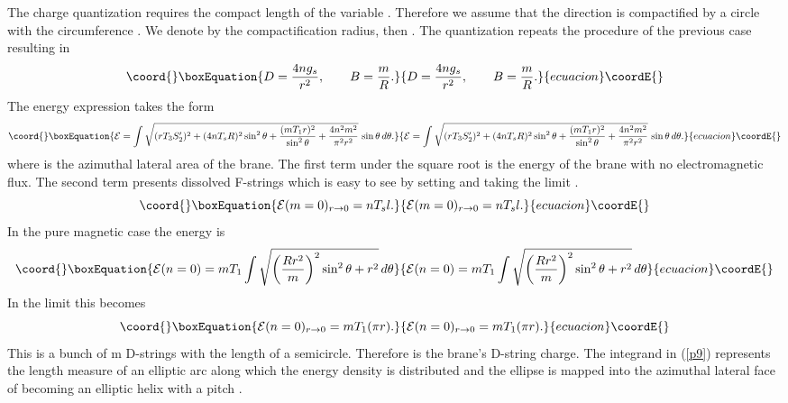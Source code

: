 \documentclass[a4paper,12pt]{article}
\begin{document}
\noindent 

The charge quantization requires the compact length of the variable \coordHE{}. 
Therefore we assume that the \coordHE{} direction is compactified by a circle with 
the circumference \coordHE{}. We denote by \coordHE{} the compactification radius, then 
\coordHE{}. 
The quantization repeats the procedure of the previous case 
resulting in
\begin{equation}\coord{}\boxEquation{
D=\frac{4ng_s}{r^2},\qquad B=\frac{m}{R}.
\label{p6}
}{
D=\frac{4ng_s}{r^2},\qquad B=\frac{m}{R}.
}{ecuacion}\coordE{}\end{equation}
The energy expression takes the form
\begin{equation}\coord{}\boxEquation{
{\cal E}=\int \sqrt{(rT_3S_2^{\prime})^2+(4nT_sR)^2\sin^2\theta+
\frac{(mT_1r)^2}{\sin^2\theta}+\frac{4n^2m^2}{\pi^2r^2}}\,\sin\theta\,d\theta.
\label{p7}
}{
{\cal E}=\int \sqrt{(rT_3S_2^{\prime})^2+(4nT_sR)^2\sin^2\theta+
\frac{(mT_1r)^2}{\sin^2\theta}+\frac{4n^2m^2}{\pi^2r^2}}\,\sin\theta\,d\theta.
}{ecuacion}\coordE{}\end{equation}
where \coordHE{} is the azimuthal lateral area of the brane.
The first term under the square root is the energy of the brane with no 
electromagnetic flux. The second term presents \coordHE{} dissolved 
F-strings which is easy to see by setting \coordHE{} and taking the limit 
\coordHE{}. 
\begin{equation}\coord{}\boxEquation{
{\cal E}(m=0)_{r\rightarrow 0}=nT_sl.
\label{p8}
}{
{\cal E}(m=0)_{r\rightarrow 0}=nT_sl.
}{ecuacion}\coordE{}\end{equation}
In the pure magnetic case the energy is
\begin{equation}\coord{}\boxEquation{ 
{\cal E}(n=0)=mT_1\int \sqrt{\bigg(\frac{Rr^2}{m}\bigg)^2\sin^2\theta +r^2}
\,d\theta
\label{p9}
}{ 
{\cal E}(n=0)=mT_1\int \sqrt{\bigg(\frac{Rr^2}{m}\bigg)^2\sin^2\theta +r^2}
\,d\theta
}{ecuacion}\coordE{}\end{equation}
In the limit \coordHE{} this becomes
\begin{equation}\coord{}\boxEquation{
{\cal E}(n=0)_{r\rightarrow 0}=mT_1(\pi r).
\label{p10}
}{
{\cal E}(n=0)_{r\rightarrow 0}=mT_1(\pi r).
}{ecuacion}\coordE{}\end{equation}
This is a bunch of m D-strings with the length of a semicircle. Therefore \coordHE{} 
is the brane's D-string charge. The integrand in (\ref{p9}) represents the 
length measure of an elliptic arc along which the energy density is 
distributed and the ellipse is mapped into the azimuthal lateral face of 
\coordHE{} becoming 
an elliptic helix with a pitch \coordHE{}.
\end{document}
